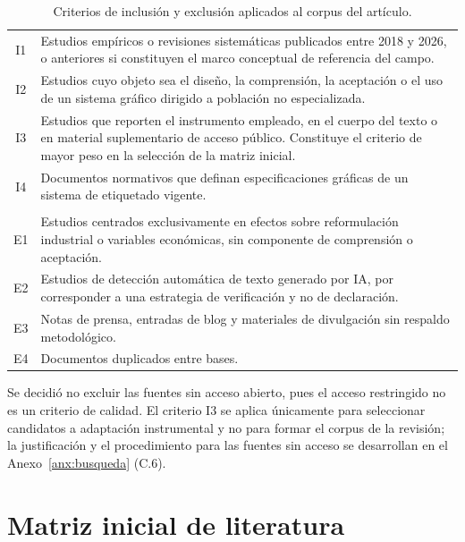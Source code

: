 \documentclass[letter,12pt]{article}
\begin{document}
\begin{table}[H]
\centering
\footnotesize
\caption{Criterios de inclusión y exclusión aplicados al corpus del artículo.}
\label{tab:criterios}
\renewcommand{\arraystretch}{1.35}
\begin{tabular}{|c|p{11.4cm}|}
\hline
\rowcolor{bgPropuesto}
\multicolumn{2}{|l|}{\textbf{\textcolor{colorPropuesto}{Criterios de inclusión}}} \\
\hline
I1 & Estudios empíricos o revisiones sistemáticas publicados entre 2018 y 2026, o anteriores si constituyen el marco conceptual de referencia del campo. \\
\hline
I2 & Estudios cuyo objeto sea el diseño, la comprensión, la aceptación o el uso de un sistema gráfico dirigido a población no especializada. \\
\hline
I3 & Estudios que reporten el instrumento empleado, en el cuerpo del texto o en material suplementario de acceso público. Constituye el criterio de mayor peso en la selección de la matriz inicial. \\
\hline
I4 & Documentos normativos que definan especificaciones gráficas de un sistema de etiquetado vigente. \\
\hline
\rowcolor{bgOriginal}
\multicolumn{2}{|l|}{\textbf{\textcolor{colorOriginal}{Criterios de exclusión}}} \\
\hline
E1 & Estudios centrados exclusivamente en efectos sobre reformulación industrial o variables económicas, sin componente de comprensión o aceptación. \\
\hline
E2 & Estudios de detección automática de texto generado por IA, por corresponder a una estrategia de verificación y no de declaración. \\
\hline
E3 & Notas de prensa, entradas de blog y materiales de divulgación sin respaldo metodológico. \\
\hline
E4 & Documentos duplicados entre bases. \\
\hline
\end{tabular}
\end{table}

Se decidió no excluir las fuentes sin acceso abierto, pues el acceso restringido no es un criterio de calidad. El criterio I3 se aplica únicamente para seleccionar candidatos a adaptación instrumental y no para formar el corpus de la revisión; la justificación y el procedimiento para las fuentes sin acceso se desarrollan en el Anexo~\ref{anx:busqueda} (C.6).

\section{Matriz inicial de literatura}\label{sec:matriz}
\end{document}

